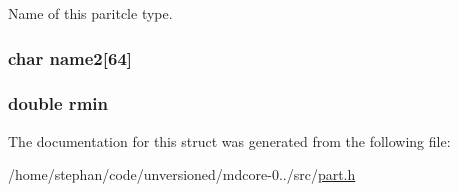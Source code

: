 Name of this paritcle type. \hypertarget{structpart__type_a431d546b86bad034e7104d8a4994f19c}{
\subsubsection[{name2}]{\setlength{\rightskip}{0pt plus 5cm}char name2\mbox{[}64\mbox{]}}}\label{structpart__type_a431d546b86bad034e7104d8a4994f19c}
\hypertarget{structpart__type_a6b40e64084cc0e48b7a6be3c8d0c6ee6}{
\subsubsection[{rmin}]{\setlength{\rightskip}{0pt plus 5cm}double rmin}}\label{structpart__type_a6b40e64084cc0e48b7a6be3c8d0c6ee6}


The documentation for this struct was generated from the following file\-:\begin{DoxyCompactItemize}
\item 
/home/stephan/code/unversioned/mdcore-\/0../src/\hyperlink{part_8h}{part.\-h}\end{DoxyCompactItemize}
